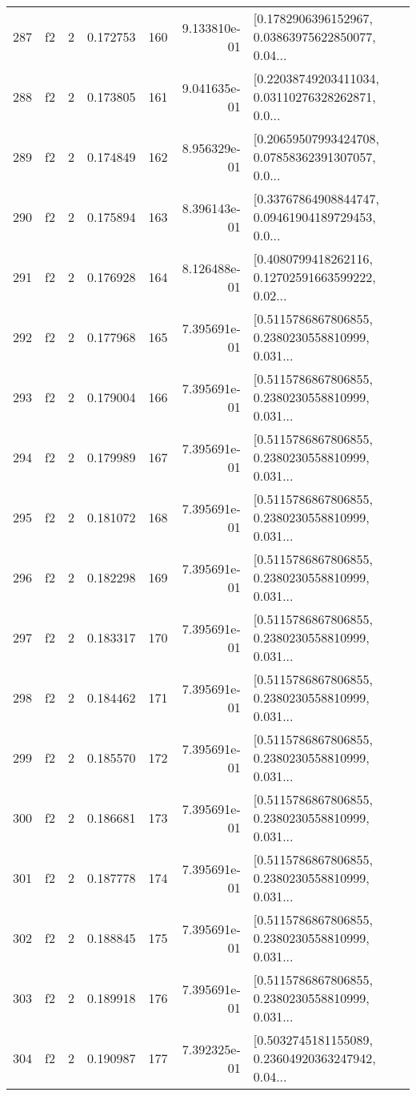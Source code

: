 \begin{tabular}{lllrlrl}
287 &  f2 &   2 &  0.172753 &  160 &  9.133810e-01 &  [0.1782906396152967, 0.03863975622850077, 0.04... \\
288 &  f2 &   2 &  0.173805 &  161 &  9.041635e-01 &  [0.22038749203411034, 0.03110276328262871, 0.0... \\
289 &  f2 &   2 &  0.174849 &  162 &  8.956329e-01 &  [0.20659507993424708, 0.07858362391307057, 0.0... \\
290 &  f2 &   2 &  0.175894 &  163 &  8.396143e-01 &  [0.33767864908844747, 0.09461904189729453, 0.0... \\
291 &  f2 &   2 &  0.176928 &  164 &  8.126488e-01 &  [0.4080799418262116, 0.12702591663599222, 0.02... \\
292 &  f2 &   2 &  0.177968 &  165 &  7.395691e-01 &  [0.5115786867806855, 0.2380230558810999, 0.031... \\
293 &  f2 &   2 &  0.179004 &  166 &  7.395691e-01 &  [0.5115786867806855, 0.2380230558810999, 0.031... \\
294 &  f2 &   2 &  0.179989 &  167 &  7.395691e-01 &  [0.5115786867806855, 0.2380230558810999, 0.031... \\
295 &  f2 &   2 &  0.181072 &  168 &  7.395691e-01 &  [0.5115786867806855, 0.2380230558810999, 0.031... \\
296 &  f2 &   2 &  0.182298 &  169 &  7.395691e-01 &  [0.5115786867806855, 0.2380230558810999, 0.031... \\
297 &  f2 &   2 &  0.183317 &  170 &  7.395691e-01 &  [0.5115786867806855, 0.2380230558810999, 0.031... \\
298 &  f2 &   2 &  0.184462 &  171 &  7.395691e-01 &  [0.5115786867806855, 0.2380230558810999, 0.031... \\
299 &  f2 &   2 &  0.185570 &  172 &  7.395691e-01 &  [0.5115786867806855, 0.2380230558810999, 0.031... \\
300 &  f2 &   2 &  0.186681 &  173 &  7.395691e-01 &  [0.5115786867806855, 0.2380230558810999, 0.031... \\
301 &  f2 &   2 &  0.187778 &  174 &  7.395691e-01 &  [0.5115786867806855, 0.2380230558810999, 0.031... \\
302 &  f2 &   2 &  0.188845 &  175 &  7.395691e-01 &  [0.5115786867806855, 0.2380230558810999, 0.031... \\
303 &  f2 &   2 &  0.189918 &  176 &  7.395691e-01 &  [0.5115786867806855, 0.2380230558810999, 0.031... \\
304 &  f2 &   2 &  0.190987 &  177 &  7.392325e-01 &  [0.5032745181155089, 0.23604920363247942, 0.04... \\

\end{tabular}
